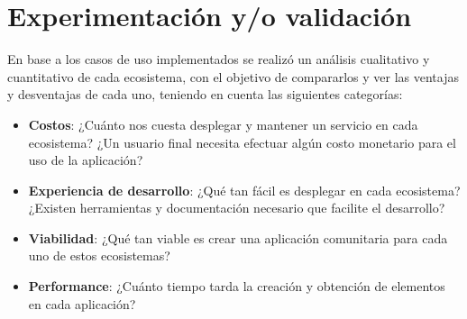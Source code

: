\section{Experimentación y/o validación}

En base a los casos de uso implementados se realizó un análisis cualitativo y cuantitativo de cada ecosistema, con el objetivo de compararlos y ver las ventajas y desventajas de cada uno, teniendo en cuenta las siguientes categorías:

\begin{itemize}
    \item \textbf{Costos}: ¿Cuánto nos cuesta desplegar y mantener un servicio en cada ecosistema? ¿Un usuario final necesita efectuar algún costo monetario para el uso de la aplicación?
    \item \textbf{Experiencia de desarrollo}: ¿Qué tan fácil es desplegar en cada ecosistema? ¿Existen herramientas y documentación necesario que facilite el desarrollo?
    \item \textbf{Viabilidad}: ¿Qué tan viable es crear una aplicación comunitaria para cada uno de estos ecosistemas?
    \item \textbf{Performance}: ¿Cuánto tiempo tarda la creación y obtención de elementos en cada aplicación?
\end{itemize}



